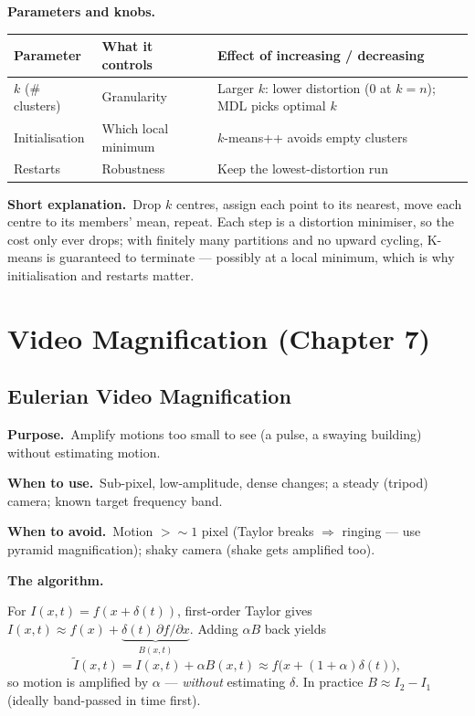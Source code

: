 \documentclass[10pt]{article}
\makeatletter
\newcommand{\Purpose}{\par\smallskip\textbf{Purpose.}\ }
\newcommand{\WhenUse}{\par\textbf{When to use.}\ }
\newcommand{\WhenAvoid}{\par\textbf{When to avoid.}\ }
\newcommand{\TheAlgo}{\par\smallskip\textbf{The algorithm.}\par\nopagebreak}
\newcommand{\Knobs}{\par\smallskip\textbf{Parameters and knobs.}\par\nopagebreak}
\newcommand{\ShortExp}{\par\smallskip\textbf{Short explanation.}\ }
\newenvironment{ptable}{\begin{center}\small\begin{tabular}{@{}p{2.5cm} p{5.9cm} p{6.2cm}@{}}\toprule
Parameter & What it controls & Effect of increasing / decreasing \\ \midrule}
{\bottomrule\end{tabular}\end{center}}
\makeatother
\begin{document}
\Knobs
\begin{ptable}
$k$ (\# clusters) & Granularity & Larger $k$: lower distortion ($0$ at $k=n$); MDL picks optimal $k$ \\
Initialisation & Which local minimum & $k$-means++ avoids empty clusters \\
Restarts & Robustness & Keep the lowest-distortion run \\
\end{ptable}
\ShortExp Drop $k$ centres, assign each point to its nearest, move each centre to its members' mean,
repeat. Each step is a distortion minimiser, so the cost only ever drops; with finitely many partitions and
no upward cycling, K-means is guaranteed to terminate --- possibly at a local minimum, which is why
initialisation and restarts matter.

\newpage
\section{Video Magnification (Chapter 7)}
\subsection{Eulerian Video Magnification}
\Purpose Amplify motions too small to see (a pulse, a swaying building) without estimating motion.
\WhenUse Sub-pixel, low-amplitude, dense changes; a steady (tripod) camera; known target frequency band.
\WhenAvoid Motion $>\!\sim1$ pixel (Taylor breaks $\Rightarrow$ ringing --- use pyramid magnification);
shaky camera (shake gets amplified too).
\TheAlgo For $I(x,t)=f(x+\delta(t))$, first-order Taylor gives
$I(x,t)\approx f(x)+\underbrace{\delta(t)\,\partial f/\partial x}_{B(x,t)}$. Adding $\alpha B$ back yields
\[
\tilde I(x,t)=I(x,t)+\alpha B(x,t)\approx f\big(x+(1+\alpha)\delta(t)\big),
\]
so motion is amplified by $\alpha$ --- \emph{without} estimating $\delta$. In practice $B\approx I_2-I_1$
(ideally band-passed in time first).

\begin{algorithm}[H]
\SetAlgoLined
{}
\caption{Eulerian magnification}
\end{algorithm}
\end{document}
